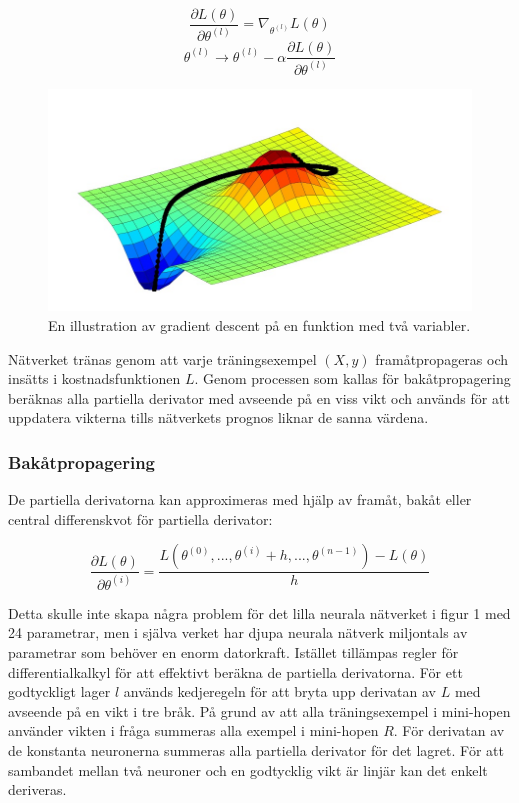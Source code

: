 \documentclass[a4paper,11pt,twoside]{article}
\newcommand*{\pd}[2]{\ensuremath{\dfrac{\partial #1}{\partial #2}}}
\begin{document}
\begin{equation}
\pd{L(\theta)}{\theta^{(l)}} = \nabla_{\theta^{(l)}} L(\theta)
\end{equation}
\begin{equation}\label{SGD}
\theta^{(l)} \to \theta^{(l)} - \alpha \pd{L(\theta)}{\theta^{(l)}}
\end{equation}
\begin{figure}[h]\label{figSGD}
	\centering
  		\includegraphics[scale=0.5]{SGD.png}
  	\caption{En illustration av gradient descent på en funktion med två variabler.\cite{figSGD}}
\end{figure}
Nätverket tränas genom att varje träningsexempel $(X,y)$ framåtpropageras och insätts i kostnadsfunktionen $L$. Genom processen som kallas för bakåtpropagering beräknas alla partiella derivator med avseende på en viss vikt och används för att uppdatera vikterna tills nätverkets prognos liknar de sanna värdena. \cite{gradient} \cite{convmath} \cite{wikiStanford}
\subsubsection{Bakåtpropagering}
De partiella derivatorna kan approximeras med hjälp av framåt, bakåt eller central differenskvot för partiella derivator: \cite{wikiStanford} \cite{gradient}

\begin{equation}
\pd{L(\theta)}{\theta^{(i)}} = \frac{L(\theta^{(0)},...,\theta^{(i)} + h, ..., \theta^{(n-1)})-L(\theta)}{h}
\end{equation}

Detta skulle inte skapa några problem för det lilla neurala nätverket i figur 1 med 24 parametrar, men i själva verket har djupa neurala nätverk miljontals av parametrar som behöver en enorm datorkraft. Istället tillämpas regler för differentialkalkyl för att effektivt beräkna de partiella derivatorna. För ett godtyckligt lager $l$ används kedjeregeln för att bryta upp derivatan av $L$ med avseende på en vikt i tre bråk. På grund av att alla träningsexempel i mini-hopen använder vikten i fråga summeras alla exempel i mini-hopen $R$. För derivatan av de konstanta neuronerna summeras alla partiella derivator för det lagret. För att sambandet mellan två neuroner och en godtycklig vikt är linjär kan det enkelt deriveras. \cite{cs231n}
\end{document}
